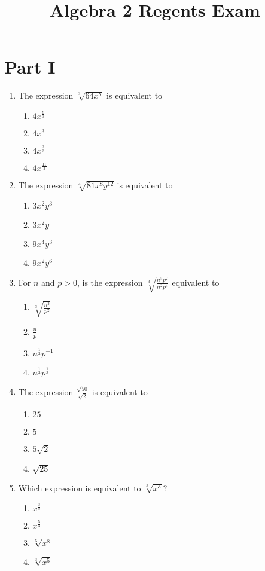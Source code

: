 \documentclass[12pt, twoside]{article}
\title{Algebra 2 Regents Exam}
\begin{document}
\maketitle

\section*{Part I}

\begin{enumerate}%


\item The expression \( \sqrt[3]{64x^8} \) is equivalent to
\begin{enumerate}
    \item \( 4x^{\frac{8}{3}} \)
    \item \( 4x^3 \)
    \item \( 4x^{\frac{2}{3}} \)
    \item \( 4x^{\frac{11}{3}} \)
\end{enumerate}

\item The expression \( \sqrt[4]{81x^8y^{12}} \) is equivalent to
\begin{enumerate}
    \item \( 3x^2y^3 \)
    \item \( 3x^2y \)
    \item \( 9x^4y^3 \)
    \item \( 9x^2y^6 \)
\end{enumerate}

\item For \( n \) and \( p > 0 \), is the expression \( \sqrt[3]{\frac{n^5 p^2}{n^2 p^4}} \) equivalent to
\begin{enumerate}
    \item \( \sqrt[3]{\frac{n^3}{p^2}} \)
    \item \( \frac{n}{p} \)
    \item \( n^{\frac{1}{3}} p^{-1} \)
    \item \( n^{\frac{1}{3}} p^{\frac{1}{3}} \)
\end{enumerate}


\item The expression \( \frac{\sqrt{50}}{\sqrt{2}} \) is equivalent to
\begin{enumerate}
    \item \( 25 \)
    \item \( 5 \)
    \item \( 5\sqrt{2} \)
    \item \( \sqrt{25} \)
\end{enumerate}

\item Which expression is equivalent to \( \sqrt[5]{x^3} \)?
\begin{enumerate}
    \item \( x^{\frac{3}{5}} \)
    \item \( x^{\frac{5}{3}} \)
    \item \( \sqrt[5]{x^8} \)
    \item \( \sqrt[3]{x^5} \)
\end{enumerate}



\end{enumerate}
\end{document}
